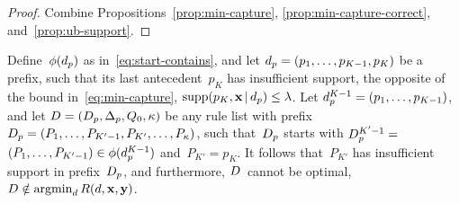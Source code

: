 \begin{proof}
Combine Propositions~\ref{prop:min-capture},
\ref{prop:min-capture-correct}, and~\ref{prop:ub-support}.
\end{proof}

\begin{proposition}
\label{prop:min-capture}
Define~$\phi(d_p)$ as in~\eqref{eq:start-contains},
and let ${d_p = (p_1, \dots, p_{K-1}, p_{K})}$ be a prefix,
such that its last antecedent~$p_{K}$ has insufficient support,
\ie the opposite of the bound in~\eqref{eq:min-capture},
${\textnormal{supp}(p_K, \mathbf{x} \,|\, d_p) \le {\lambda}}$.
%
Let ${d_p^{K-1} = (p_1, \dots, p_{K-1})}$,
and let ${{D} = (D_p, \Delta_p, Q_0, \kappa)}$
be any rule list with prefix
${D_p = (P_1, \dots, P_{K'-1}, P_{K'}, \dots, P_{\kappa})}$,
such that~$D_p$ starts with ${D_p^{K'-1} =}$
${(P_1, \dots, P_{K'-1}) \in \phi(d_p^{K-1})}$
and~${P_{K'} = p_{K}}$.
%
It follows that~$P_{K'}$ has insufficient support in
prefix~$D_p$, and furthermore, ${D}$~cannot be optimal,
\ie ${{D} \notin \operatorname*{argmin}_{{d}} R({d}, \mathbf{x}, \mathbf{y})}$.
\end{proposition}

